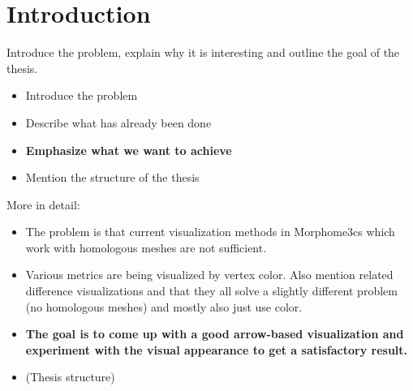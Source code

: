 \chapter*{Introduction}

Introduce the problem, explain why it is interesting and outline the goal of the thesis.

\begin{itemize}
\item Introduce the problem
\item Describe what has already been done
\item {\bf Emphasize what we want to achieve}
\item Mention the structure of the thesis
\end{itemize}

More in detail:

\begin{itemize}
\item The problem is that current visualization methods in Morphome3cs which work with homologous meshes are not sufficient.
\item Various metrics are being visualized by vertex color. Also mention related difference visualizations and that they all solve a slightly different problem (no homologous meshes) and mostly also just use color.
\item {\bf The goal is to come up with a good arrow-based visualization and experiment with the visual appearance to get a satisfactory result.}
\item (Thesis structure)
\end{itemize}